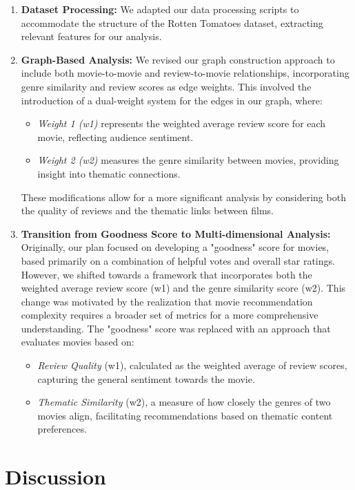 \documentclass[fontsize=11pt]{article}
\begin{document}
\begin{enumerate}
    \item \textbf{Dataset Processing:} We adapted our data processing scripts to accommodate the structure of the Rotten Tomatoes dataset, extracting relevant features for our analysis.
    \item \textbf{Graph-Based Analysis:} We revised our graph construction approach to include both movie-to-movie and review-to-movie relationships, incorporating genre similarity and review scores as edge weights. This involved the introduction of a dual-weight system for the edges in our graph, where:
    \begin{itemize}
        \item \textit{Weight 1 (w1)} represents the weighted average review score for each movie, reflecting audience sentiment.
        \item \textit{Weight 2 (w2)} measures the genre similarity between movies, providing insight into thematic connections.
    \end{itemize}
    These modifications allow for a more significant analysis by considering both the quality of reviews and the thematic links between films.
    \item \textbf{Transition from Goodness Score to Multi-dimensional Analysis:} Originally, our plan focused on developing a "goodness" score for movies, based primarily on a combination of helpful votes and overall star ratings. However, we shifted towards a framework that incorporates both the weighted average review score (w1) and the genre similarity score (w2). This change was motivated by the realization that movie recommendation complexity requires a broader set of metrics for a more comprehensive understanding. The "goodness" score was replaced with an approach that evaluates movies based on:
    \begin{itemize}
        \item \textit{Review Quality} (w1), calculated as the weighted average of review scores, capturing the general sentiment towards the movie.
        \item \textit{Thematic Similarity} (w2), a measure of how closely the genres of two movies align, facilitating recommendations based on thematic content preferences.
    \end{itemize}
\end{enumerate}

\section*{Discussion}
\end{document}
